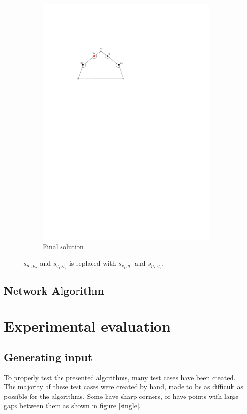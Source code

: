 \documentclass[11pt]{article}
\begin{document}
\begin{figure}[hbtp]
\begin{subfigure}{.33\linewidth}
  \includegraphics[width=0.9\linewidth]{multiplecurves/algo_final.pdf}
  \caption{Final solution}
\end{subfigure}%
  \caption{$s_{p_1,p_2}$ and $s_{q_1,q_2}$ is replaced with $s_{p_1,q_1}$ and $s_{p_2,q_2}$.}
\label{fig:multiple_pppqq}
\end{figure}


\subsection{Network Algorithm}

\section{Experimental evaluation}
\subsection{Generating input}
To properly test the presented algorithms, many test cases have been created. The majority of these test cases were created by hand, made to be as difficult as possible for the algorithms. Some have sharp corners, or have points with large gaps between them as shown in figure \ref{single}.
\end{document}
